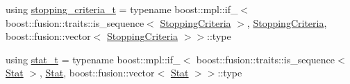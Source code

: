 \begin{DoxyCompactItemize}
\item 
using \hyperlink{classlimbo_1_1bayes__opt_1_1_bo_base_af3ce6ecc075e643cb1bdde0fb139ce21}{stopping\+\_\+criteria\+\_\+t} = typename boost\+::mpl\+::if\+\_\+$<$ boost\+::fusion\+::traits\+::is\+\_\+sequence$<$ \hyperlink{classlimbo_1_1bayes__opt_1_1_bo_base_a313e0d0d1eeceb3d090fbc2aafcc1984}{Stopping\+Criteria} $>$, \hyperlink{classlimbo_1_1bayes__opt_1_1_bo_base_a313e0d0d1eeceb3d090fbc2aafcc1984}{Stopping\+Criteria}, boost\+::fusion\+::vector$<$ \hyperlink{classlimbo_1_1bayes__opt_1_1_bo_base_a313e0d0d1eeceb3d090fbc2aafcc1984}{Stopping\+Criteria} $>$$>$\+::type
\item 
using \hyperlink{classlimbo_1_1bayes__opt_1_1_bo_base_a407dede091900c86f4bf8001273c26e2}{stat\+\_\+t} = typename boost\+::mpl\+::if\+\_\+$<$ boost\+::fusion\+::traits\+::is\+\_\+sequence$<$ \hyperlink{classlimbo_1_1bayes__opt_1_1_bo_base_a4dfe2a37a52a4a964bce83cc580bff2e}{Stat} $>$, \hyperlink{classlimbo_1_1bayes__opt_1_1_bo_base_a4dfe2a37a52a4a964bce83cc580bff2e}{Stat}, boost\+::fusion\+::vector$<$ \hyperlink{classlimbo_1_1bayes__opt_1_1_bo_base_a4dfe2a37a52a4a964bce83cc580bff2e}{Stat} $>$$>$\+::type
\end{DoxyCompactItemize}
